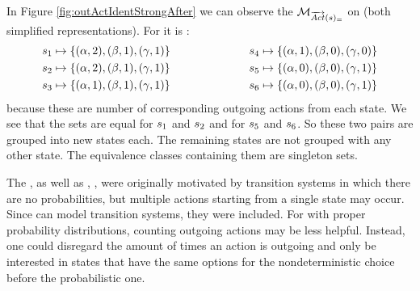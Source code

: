 \documentclass[preview]{standalone}
\begin{document}
\begin{exmp}
	In Figure \ref{fig:outActIdentStrongAfter} we can observe the \viewN $\viewstrongoutactident$ on \mdp (both simplified representations). 
For \viewstrongoutactident it is \gfctstrongoutactident :
\begin{alignat*}{3}
	&{s}_1 \mapsto \{({\alpha},2), ({\beta},1), ({\gamma},1)\} \quad\quad\quad\quad\quad\quad &&{s}_4 \mapsto \{({\alpha},1), ({\beta},0), ({\gamma},0)\} \\
	&{s}_2 \mapsto \{({\alpha},2), ({\beta},1), ({\gamma},1)\} \quad\quad\quad\quad && {s}_5 \mapsto \{({\alpha},0), ({\beta},0), ({\gamma},1)\} \\
	&{s}_3 \mapsto \{({\alpha},1), ({\beta},1), ({\gamma},1)\} \quad\quad\quad\quad && {s}_6 \mapsto \{({\alpha},0), ({\beta},0), ({\gamma},1)\}	
\end{alignat*}
because these are number of corresponding outgoing actions from each state. We see that the sets are equal for ${s}_1$ and ${s}_2$ and for ${s}_5$ and ${s}_6$. So these two pairs are grouped into new states each. The remaining states are not grouped with any other state. The equivalence classes containing them are singleton sets.
\end{exmp}

The \viewN \viewstrongoutactident, as well as \viewminoutaction, \viewmaxoutaction, \viewspanoutaction were originally motivated by transition systems in which there are no probabilities, but multiple actions starting from a single state may occur. Since \mdpsN can model transition systems, they were included. For \mdpsN with proper probability distributions, counting outgoing actions may be less helpful. Instead, one could disregard the amount of times an action is outgoing and only be interested in states that have the same options for the nondeterministic choice before the probabilistic one.
\end{document}
